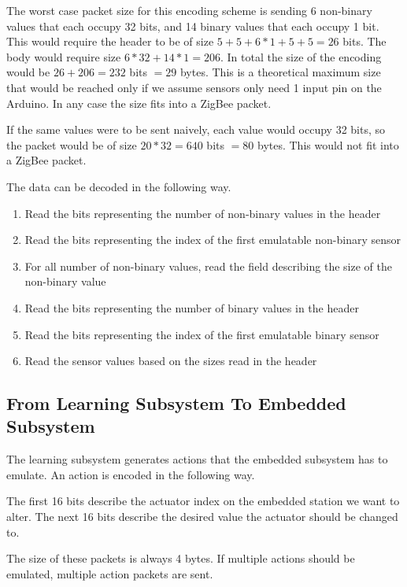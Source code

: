 The worst case packet size for this encoding scheme is sending 6 non-binary values that each occupy 32 bits, and 14 binary values that each occupy 1 bit. This would require the header to be of size $5 + 5 + 6 * 1 + 5 + 5 = 26$ bits. The body would require size $6 * 32 + 14 * 1 = 206$. In total the size of the encoding would be $26 + 206 = 232$ bits $= 29$ bytes. This is a theoretical maximum size that would be reached only if we assume sensors only need 1 input pin on the Arduino. In any case the size fits into a ZigBee packet.

If the same values were to be sent naively, each value would occupy 32 bits, so the packet would be of size $20 * 32 = 640$ bits $=80$ bytes. This would not fit into a ZigBee packet.

The data can be decoded in the following way.

\begin{enumerate}
\item Read the bits representing the number of non-binary values in the header
\item Read the bits representing the index of the first emulatable non-binary sensor
\item For all number of non-binary values, read the field describing the size of the non-binary value
\item Read the bits representing the number of binary values in the header
\item Read the bits representing the index of the first emulatable binary sensor
\item Read the sensor values based on the sizes read in the header
\end{enumerate}

\subsection{From Learning Subsystem To Embedded Subsystem}

The learning subsystem generates actions that the embedded subsystem has to emulate. An action is encoded in the following way.

The first 16 bits describe the actuator index on the embedded station we want to alter. The next 16 bits describe the desired value the actuator should be changed to.

The size of these packets is always 4 bytes. If multiple actions should be emulated, multiple action packets are sent.

